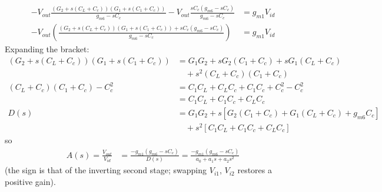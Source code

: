 \begin{enumerate}
    \begin{align*}
      -V_{out}\frac{(G_2 + s(C_L + C_c))(G_1 + s(C_1 + C_c))}{g_{m6} - sC_c} - V_{out}\frac{sC_c (g_{m6} - sC_c)}{g_{m6} - sC_c} &= g_{m1} V_{id} \\
      -V_{out}\left(\frac{(G_2 + s(C_L + C_c))(G_1 + s(C_1 + C_c)) + sC_c (g_{m6} - sC_c)}{g_{m6} - sC_c}\right) &= g_{m1} V_{id}
    \end{align*}
    Expanding the bracket:
    \begin{align*}
      (G_2 + s(C_L + C_c))(G_1 + s(C_1 + C_c)) &= G_1 G_2 + s G_2 (C_1 + C_c) + s G_1 (C_L + C_c) \\
      &\quad + s^2 (C_L + C_c)(C_1 + C_c) \\
      (C_L + C_c)(C_1 + C_c) - C_c^2 &= C_1 C_L + C_L C_c + C_1 C_c + C_c^2 - C_c^2 \\
      &= C_1 C_L + C_1 C_c + C_L C_c \\
      D(s) &= G_1 G_2 + s\left[G_2(C_1 + C_c) + G_1(C_L + C_c) + g_{m6} C_c\right] \\
      &\quad + s^2\left[C_1 C_L + C_1 C_c + C_L C_c\right]
    \end{align*}
    so
    \begin{align*}
      A(s) = \frac{V_{out}}{V_{id}} &= \frac{-g_{m1}(g_{m6} - sC_c)}{D(s)} = \frac{-g_{m1}(g_{m6} - sC_c)}{a_0 + a_1 s + a_2 s^2} \tag{3}
    \end{align*}
    (the sign is that of the inverting second stage; swapping \(V_{i1}\),
    \(V_{i2}\) restores a positive gain).
\end{enumerate}

